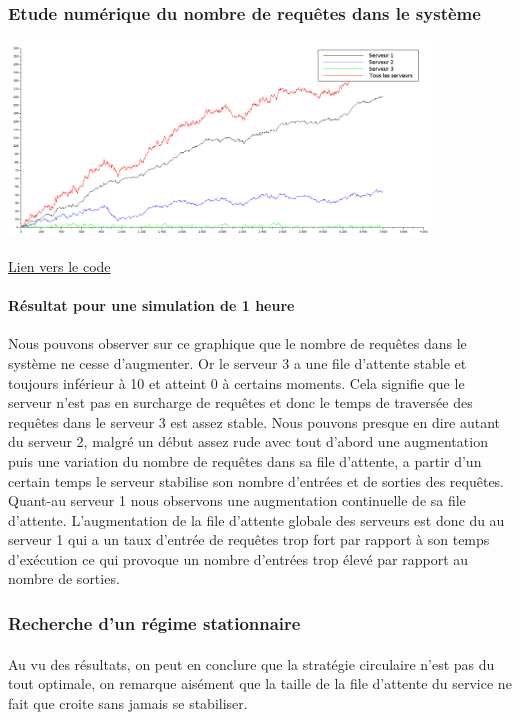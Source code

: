 \documentclass{article}
\begin{document}
\subsubsection{Etude numérique du nombre de requêtes dans le système}

\begin{center}
	\includegraphics[width=425px]{img/tls.png}
\end{center}
\hyperref[tls]{Lien vers le code}
\paragraph{Résultat pour une simulation de 1 heure}
Nous pouvons observer sur ce graphique que le nombre de requêtes dans le système ne cesse d'augmenter. Or le serveur 3 a une file d'attente stable et toujours inférieur à 10 et atteint 0 à certains moments. Cela signifie que le serveur n'est pas en surcharge de requêtes et donc le temps de traversée des requêtes dans le serveur 3 est assez stable. Nous pouvons presque en dire autant du serveur 2, malgré un début assez rude avec tout d'abord une augmentation puis une variation du nombre de requêtes dans sa file d'attente, a partir d'un certain temps le serveur stabilise son nombre d'entrées et de sorties des requêtes. Quant-au serveur 1 nous observons une augmentation continuelle de sa file d'attente. L'augmentation de la file d'attente globale des serveurs est donc du au serveur 1 qui a un taux d'entrée de requêtes trop fort par rapport à son temps d’exécution ce qui provoque un nombre d'entrées trop élevé par rapport au nombre de sorties.

\subsubsection{Recherche d'un régime stationnaire}

\paragraph{}
Au vu des résultats, on peut en conclure que la stratégie circulaire n'est pas du tout optimale, on remarque aisément que la taille de la file d'attente du service ne fait que croite sans jamais se stabiliser.
\end{document}
